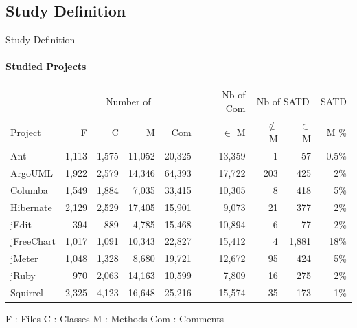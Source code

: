 \documentclass{beamer}
\begin{document}
\begin{darkframes}
	    
	    	\subsection{Study Definition}	
	    	
	    		\begin{frame}{Study Definition}
	    			\framesubtitle{Studied Projects}
	    			\begin{table}[t]
	    				{
	    					\carlitoTLF %
	    					\scriptsize
	    					\centering
	    					\begin{tabularx}{\textwidth}{l | r r r r | r | r r | r}
   						  		& \multicolumn{4}{c|}{Number of}  & Nb of Com & \multicolumn{2}{c|}{Nb of SATD}  & SATD \\
	    						Project  & F & C & M & Com & $\in$ M & $\notin$ M & $\in$ M & M \% \\
	    						\hline
	    						Ant & 1,113 & 1,575 & 11,052 & 20,325               & 13,359        &  1 & 57 & 0.5\% \\
	    						ArgoUML& 1,922 & 2,579 & 14,346 & 64,393       &  17,722       & 203 & 425  & 2\%\\
	    						Columba & 1,549 & 1,884 & 7,035 & 33,415           & 10,305        & 8 & 418 & 5\%  \\
	    						Hibernate & 2,129 & 2,529 & 17,405 & 15,901 & 9,073        & 21  &  377  &  2\%\\
	    						jEdit & 394 & 889 & 4,785 & 15,468                     &10,894         & 6  & 77  & 2\% \\
	    						jFreeChart & 1,017 & 1,091 & 10,343 & 22,827  & 15,412       &  4  & 1,881  & 18\%\\
	    						jMeter & 1,048 & 1,328 & 8,680 & 19,721                &  12,672      & 95 &  424 & 5\%  \\
	    						jRuby & 970 & 2,063 & 14,163 & 10,599               & 7,809        & 16   & 275  &  2\%\\
	    						Squirrel & 2,325 & 4,123 & 16,648 & 25,216         & 15,574      &35  & 173  & 1\% \\
	    					\end{tabularx}
	    				}
	    			\end{table}
    				\tiny
    				\centering
    				F : Files \hspace{5mm}  C : Classes \hspace{5mm} M : Methods \hspace{5mm} Com : Comments

\end{frame}
\end{darkframes}
\end{document}
